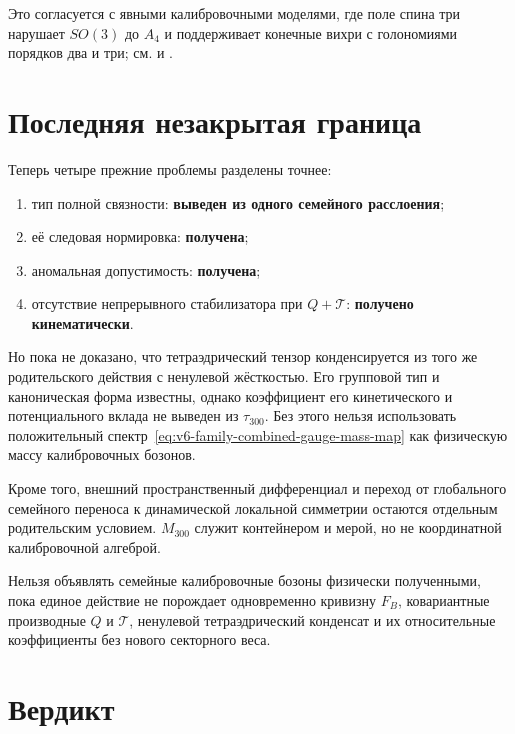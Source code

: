 Это согласуется с явными калибровочными моделями, где поле спина три
нарушает $SO(3)$ до $A_4$ и поддерживает конечные вихри с голономиями
порядков два и три; см.  и
.

\section{Последняя незакрытая граница}

Теперь четыре прежние проблемы разделены точнее:
\begin{enumerate}
 \item тип полной связности: \textbf{выведен из одного семейного
 расслоения};
 \item её следовая нормировка: \textbf{получена};
 \item аномальная допустимость: \textbf{получена};
 \item отсутствие непрерывного стабилизатора при $Q+\mathcal T$:
 \textbf{получено кинематически}.
\end{enumerate}

Но пока не доказано, что тетраэдрический тензор конденсируется из того же
родительского действия с ненулевой жёсткостью. Его групповой тип и
каноническая форма известны, однако коэффициент его кинетического и
потенциального вклада не выведен из $\tau_{300}$. Без этого нельзя
использовать положительный спектр~\eqref{eq:v6-family-combined-gauge-mass-map}
как физическую массу калибровочных бозонов.

Кроме того, внешний пространственный дифференциал и переход от глобального
семейного переноса к динамической локальной симметрии остаются отдельным
родительским условием. $M_{300}$ служит контейнером и мерой, но не
координатной калибровочной алгеброй.

\begin{nogocriterion}
Нельзя объявлять семейные калибровочные бозоны физически полученными, пока
единое действие не порождает одновременно кривизну $F_B$, ковариантные
производные $Q$ и $\mathcal T$, ненулевой тетраэдрический конденсат и их
относительные коэффициенты без нового секторного веса.
\end{nogocriterion}

\section{Вердикт}

